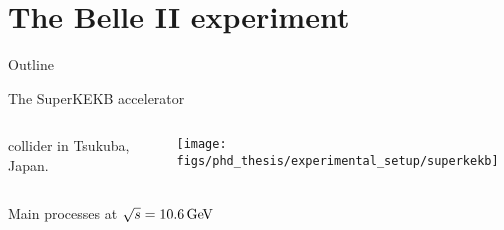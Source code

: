 \section{The Belle II experiment}
\begin{frame}[noframenumbering]{Outline}
 \tableofcontents[currentsection, subsubsectionstyle=hide]
\end{frame}
\begin{frame}{The SuperKEKB accelerator}
\begin{columns}
\begin{column}{0.48\linewidth} 
\bi \small
\item{\epem collider in Tsukuba, Japan.}
\bi
{}
\ei
{}
\bi
{}
\ei
\ei
\end{column}
\begin{column}{0.52\linewidth}
\centering
\texttt{[image: figs/phd\_thesis/experimental\_setup/superkekb]}\\
\end{column}
\end{columns}
\end{frame}
\begin{frame}{Main \epem processes at $\sqrt{s}=10.6\mathrm{\,Ge\kern -0.1em V}$}
\centering
{}
\end{frame}
